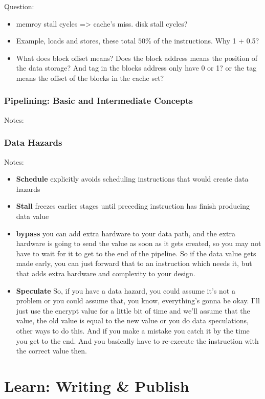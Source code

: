 \documentclass[8pt,UTF8]{article}
\begin{document}
        Question:
        \begin{itemize}
            \item memroy stall cycles => cache's miss. disk stall cycles?
            \item Example, loads and stores, these total $50\%$ of the instructions. Why 1 + 0.5?
            \item What does block offset means? Does the block address means the position of the data storage? And tag in the blocks address only have 0 or 1? or the tag means the offset of the blocks in the cache set?
        \end{itemize}
    \subsubsection{Pipelining: Basic and Intermediate Concepts}
        Notes:
    \subsubsection{Data Hazards}
        Notes:
        \begin{itemize}
        	\item \textbf{Schedule} explicitly avoids scheduling instructions that would create data hazards
        	\item \textbf{Stall} freezes earlier stages until preceding instruction has finish producing data value
        	\item \textbf{bypass} you can add extra hardware to your data path, and the extra hardware is going to send the value as soon as it gets created, so you may not have to wait for it to get to the end of the pipeline. So if the data value gets made early, you can just forward that to an instruction which needs it, but that adds extra hardware and complexity to your design. 
        	\item \textbf{Speculate} So, if you have a data hazard, you could assume it's not a problem or you could assume that, you know, everything's gonna be okay. I'll just use the encrypt value for a little bit of time and we'll assume that the value, the old value is equal to the new value or you do data speculations, other ways to do this. And if you make a mistake you catch it by the time you get to the end. And you basically have to re-execute the instruction with the correct value then.  
        \end{itemize}

\section{Learn: Writing \& Publish}
\end{document}
